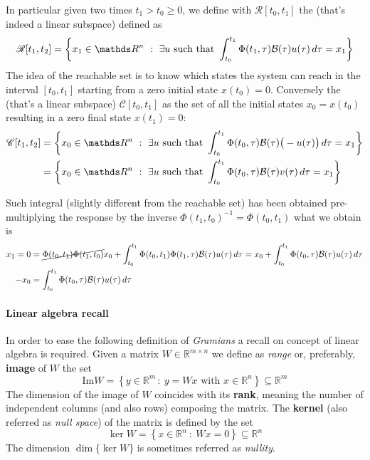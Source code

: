 	In particular given two times $t_1 > t_0 \geq 0$, we define with $\mathscr R[t_0,t_1]$ the  (that's indeed a linear subspace) defined as
	\begin{equation}
		\mathscr R[t_1,t_2] = \left\{ x_1 \in \mathds R^n \ : \ \exists u \textrm{ such that } \int_{t_0}^{t_1} \Phi(t_1,\tau) \B(\tau) u(\tau) \, d\tau = x_1 \right\}
	\end{equation}
	The idea of the reachable set is to know which states the system can reach in the interval $[t_0,t_1]$ starting from a zero initial state $x(t_0) = 0$. Conversely the  (that's a linear subspace) $\mathscr C[t_0,t_1]$ as the set of all the initial states $x_0 = x(t_0)$ resulting in a zero final state $x(t_1) = 0$:
	\begin{equation}
	\begin{aligned}
		\mathscr C[t_1,t_2] & = \left\{ x_0 \in \mathds R^n \ : \ \exists u \textrm{ such that } \int_{t_0}^{t_1} \Phi(t_0,\tau) \B(\tau) \big(-u(\tau)\big) \, d\tau = x_1 \right\} \\
		& = \left\{ x_0 \in \mathds R^n \ : \ \exists u \textrm{ such that } \int_{t_0}^{t_1} \Phi(t_0,\tau) \B(\tau) v(\tau) \, d\tau = x_1 \right\}
	\end{aligned}
	\end{equation}
		
	Such integral (slightly different from the reachable set) has been obtained pre-multiplying the response by the inverse $\Phi(t_1,t_0)^{-1} = \Phi(t_0,t_1)$ what we obtain is
	\begin{align*}
		x_1 = 0 & =  \cancel{\Phi(t_0,t_1) \Phi(t_1,t_0)} x_0 + \int_{t_0}^{t_1} \Phi(t_0,t_1) \Phi(t_1,\tau) \mathcal{B} (\tau) u(\tau) \, d\tau = x_0 + \int_{t_0}^{t_1} \Phi(t_0,\tau) \mathcal{B}(\tau) u(\tau)\, d\tau \\
		-x_0 & = \int_{t_0}^{t_1} \Phi(t_0,\tau) \mathcal{B}(\tau) u(\tau)\, d\tau
	\end{align*}
	
	\paragraph{Linear algebra recall} In order to ease the following definition of \textit{Gramians} a recall on concept of linear algebra is required. Given a matrix $W\in \mathds R^{m\times n}$ we define as \textit{range} or, preferably, \textbf{image} of $W$ the set
	\[ \textrm{Im} W = \left\{ y \in \mathds R^m\, : \  y = W x \textrm{ with } x\in \mathds R^n \right\} \subseteq \mathds R^m \]
	The dimension of the image of $W$ coincides with its \textbf{rank}, meaning the number of independent columns (and also rows) composing the matrix. The \textbf{kernel} (also referred as \textit{null space}) of the matrix is defined by the set
	\[ \ker W = \left\{ x \in \mathds R^n \ : \ W x = 0 \right\} \subseteq \mathds R^n\]
	The dimension $\dim\{\ker W\}$ is sometimes referred as \textit{nullity}.
	
